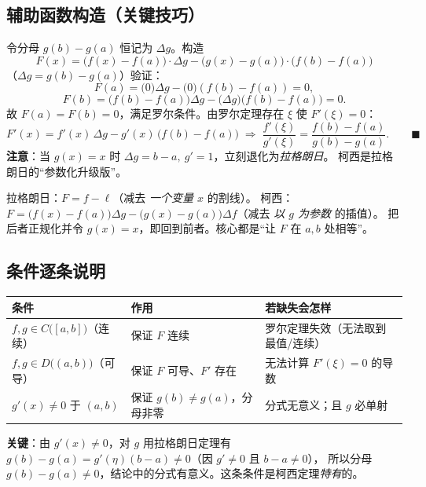 \documentclass[11pt]{article}
\begin{document}
\subsection*{辅助函数构造（关键技巧）}
令分母 $g(b)-g(a)$ 恒记为 $\Delta g$。构造
\[
\boxed{\,F(x)=\big(f(x)-f(a)\big)\cdot \Delta g-\big(g(x)-g(a)\big)\cdot\big(f(b)-f(a)\big)\,}
\]
（$\Delta g=g(b)-g(a)$）验证：
\[
F(a)=\big(0\big)\Delta g-\big(0\big)(f(b)-f(a))=0,
\]
\[
F(b)=\big(f(b)-f(a)\big)\Delta g-\big(\Delta g\big)\big(f(b)-f(a)\big)=0 .
\]
故 $F(a)=F(b)=0$，满足罗尔条件。由罗尔定理存在 $\xi$ 使 $F'(\xi)=0$：
\[
F'(x)=f'(x)\,\Delta g-g'(x)\,\big(f(b)-f(a)\big)
\;\Longrightarrow\;
\frac{f'(\xi)}{g'(\xi)}=\frac{f(b)-f(a)}{g(b)-g(a)}.\qquad\blacksquare
\]
\textbf{注意}：当 $g(x)=x$ 时 $\Delta g=b-a,\ g'=1$，立刻退化为\emph{拉格朗日}。
柯西是拉格朗日的“参数化升级版”。

\begin{tcolorbox}[colback=boxbg,colframe=curve!60,title={\bfseries 与拉格朗日构造的对应}]
拉格朗日：$F=f-\ell$（减去 \emph{一个变量 $x$} 的割线）。\;
柯西：$F=\big(f(x)-f(a)\big)\Delta g-\big(g(x)-g(a)\big)\Delta f$（减去 \emph{以 $g$ 为参数} 的插值）。
把后者正规化并令 $g(x)=x$，即回到前者。核心都是“让 $F$ 在 $a,b$ 处相等”。
\end{tcolorbox}

\subsection*{条件逐条说明}

\begin{center}
\renewcommand{\arraystretch}{1.55}
\begin{tabular}{>{\centering\arraybackslash}p{4.6cm} >{\centering\arraybackslash}p{3.4cm} >{\centering\arraybackslash}p{6.6cm}}
\toprule
\textbf{条件} & \textbf{作用} & \textbf{若缺失会怎样}\\
\midrule
$f,g\in C\big([a,b]\big)$（连续） & 保证 $F$ 连续 & 罗尔定理失效（无法取到最值/连续）\\
$f,g\in D\big((a,b)\big)$（可导） & 保证 $F$ 可导、$F'$ 存在 & 无法计算 $F'(\xi)=0$ 的导数\\
$g'(x)\neq 0$ 于 $(a,b)$ & 保证 $g(b)\neq g(a)$，分母非零 & 分式无意义；且 $g$ 必单射\\
\bottomrule
\end{tabular}
\end{center}

\noindent\textbf{关键}：由 $g'(x)\neq0$，对 $g$ 用拉格朗日定理有
$g(b)-g(a)=g'(\eta)(b-a)\neq 0$（因 $g'\neq0$ 且 $b-a\neq0$），
所以分母 $g(b)-g(a)\neq 0$，结论中的分式有意义。这条条件是柯西定理\emph{特有}的。
\end{document}
